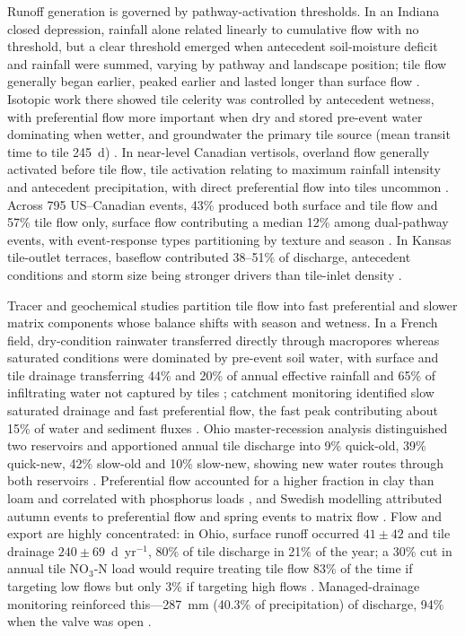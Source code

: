 Runoff generation is governed by pathway-activation thresholds. In an Indiana closed depression, rainfall alone related linearly to cumulative flow with no threshold, but a clear threshold emerged when antecedent soil-moisture deficit and rainfall were summed, varying by pathway and landscape position; tile flow generally began earlier, peaked earlier and lasted longer than surface flow \parencite{Williams2019}. Isotopic work there showed tile celerity was controlled by antecedent wetness, with preferential flow more important when dry and stored pre-event water dominating when wetter, and groundwater the primary tile source (mean transit time to tile 245~d) \parencite{Williams2021}. In near-level Canadian vertisols, overland flow generally activated before tile flow, tile activation relating to maximum rainfall intensity and antecedent precipitation, with direct preferential flow into tiles uncommon \parencite{Kokulan2019}. Across 795 US--Canadian events, 43\% produced both surface and tile flow and 57\% tile flow only, surface flow contributing a median 12\% among dual-pathway events, with event-response types partitioning by texture and season \parencite{Macrae2019}. In Kansas tile-outlet terraces, baseflow contributed 38--51\% of discharge, antecedent conditions and storm size being stronger drivers than tile-inlet density \parencite{Stops2022}.

Tracer and geochemical studies partition tile flow into fast preferential and slower matrix components whose balance shifts with season and wetness. In a French field, dry-condition rainwater transferred directly through macropores whereas saturated conditions were dominated by pre-event soil water, with surface and tile drainage transferring 44\% and 20\% of annual effective rainfall and 65\% of infiltrating water not captured by tiles \parencite{Gaillot2023}; catchment monitoring identified slow saturated drainage and fast preferential flow, the fast peak contributing about 15\% of water and sediment fluxes \parencite{Grangeon2021}. Ohio master-recession analysis distinguished two reservoirs and apportioned annual tile discharge into 9\% quick-old, 39\% quick-new, 42\% slow-old and 10\% slow-new, showing new water routes through both reservoirs \parencite{Nazari2021}. Preferential flow accounted for a higher fraction in clay than loam and correlated with phosphorus loads \parencite{Pluer2020}, and Swedish modelling attributed autumn events to preferential flow and spring events to matrix flow \parencite{Salazar2011}. Flow and export are highly concentrated: in Ohio, surface runoff occurred $41\pm42$ and tile drainage $240\pm69$~d~yr$^{-1}$, 80\% of tile discharge in 21\% of the year; a 30\% cut in annual tile NO$_3$-N load would require treating tile flow 83\% of the time if targeting low flows but only 3\% if targeting high flows \parencite{Williams2018}. Managed-drainage monitoring reinforced this---287~mm (40.3\% of precipitation) of discharge, 94\% when the valve was open \parencite{Miller2022}.

